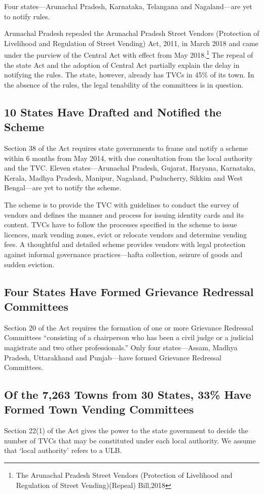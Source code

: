 \documentclass[a4paper, 12pt, twoside]{article}
\begin{document}
	Four states—Arunachal Pradesh, Karnataka, Telangana and Nagaland—are yet to notify rules.

	Arunachal Pradesh repealed the Arunachal Pradesh Street Vendors (Protection of Livelihood and Regulation of Street Vending) Act, 2011, in March 2018 and came under the purview of the Central Act with effect from May 2018.\footnote{The Arunachal Pradesh Street Vendors (Protection of Livelihood and Regulation of Street Vending)(Repeal) Bill,2018} The repeal of the state Act and the adoption of Central Act partially explain the delay in notifying the rules. The state, however, already has TVCs in 45\% of its town. In the absence of the rules, the legal tenability of the committees is in question.

\subsection*{10 States Have Drafted and Notified the Scheme}
	Section 38 of the Act requires state governments to frame and notify a scheme within 6 months from May 2014, with due consultation from the local authority and the TVC. Eleven states—Arunachal Pradesh, Gujarat, Haryana, Karnataka, Kerala, Madhya Pradesh, Manipur, Nagaland, Puducherry, Sikkim and West Bengal—are yet to notify the scheme.

	The scheme is to provide the TVC with guidelines to conduct the survey of vendors and defines the manner and process for issuing identity cards and its content. TVCs have to follow the processes specified in the scheme to issue licences, mark vending zones, evict or relocate vendors and determine vending fees. A thoughtful and detailed scheme provides vendors with legal protection against informal governance practices—hafta collection, seizure of goods and sudden eviction.

\subsection*{Four States Have Formed Grievance Redressal Committees}
	Section 20 of the Act requires the formation of one or more Grievance Redressal Committees “consisting of a chairperson who has been a civil judge or a judicial magistrate and two other professionals.” Only four states—Assam, Madhya Pradesh, Uttarakhand and Punjab—have formed Grievance Redressal Committees.

\subsection*{Of the 7,263 Towns from 30 States, 33\% Have Formed Town Vending Committees}
	Section 22(1) of the Act gives the power to the state government to decide the number of TVCs that may be  constituted under each local authority. We assume that ‘local authority’ refers to a ULB.
\end{document}
